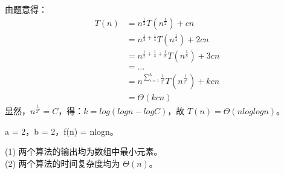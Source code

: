 \documentclass[12pt, a4paper, oneside]{ctexart}
\begin{document}
\begin{solution}[2.18]
由题意得：
\begin{align*}
    T(n) &= n^{\frac{1}{2}} T(n^{\frac{1}{2}}) + cn \\
    &= n^{\frac{1}{2} + \frac{1}{4}} T(n^{\frac{1}{4}}) + 2cn \\
    &= n^{\frac{1}{2} + \frac{1}{4} + \frac{1}{8}} T(n^{\frac{1}{8}}) + 3cn \\
    &= \dots \\
    &= n^{\sum_{i = 1}^{k} \frac{1}{2^i}} T(n^{\frac{1}{2^k}}) + kcn \\
    &= \Theta(kcn)
\end{align*}
显然，$n^{\frac{1}{2^k}} = C$，得：$k = log(logn - logC)$，故 $T(n) = \Theta(nloglogn)$。
\end{solution}

\begin{solution}[2.19]
a = 2，b = 2，f(n) = nlogn。
\end{solution}

\begin{solution}[2.22]
(1) 两个算法的输出均为数组中最小元素。
\\(2) 两个算法的时间复杂度均为 $\Theta(n)$。
\end{solution}
\end{document}
